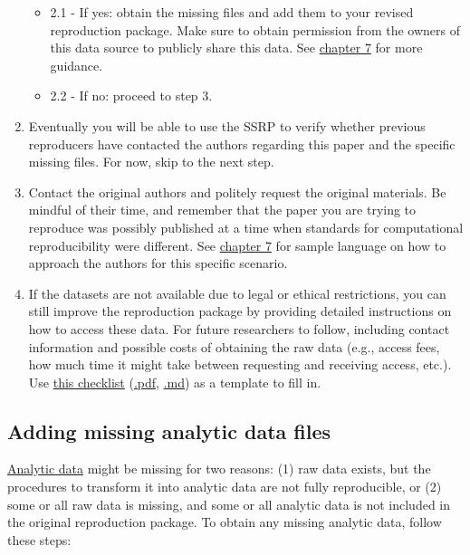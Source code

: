 \documentclass[
  openany]{book}
\providecommand{\tightlist}{%
  \setlength{\itemsep}{0pt}\setlength{\parskip}{0pt}}
\begin{document}
\begin{enumerate}
  \begin{itemize}
  \tightlist
  \item
    2.1 - If yes: obtain the missing files and add them to your revised reproduction package. Make sure to obtain permission from the owners of this data source to publicly share this data. See \href{https://bitss.github.io/ACRE/guidance-for-a-constructive-exchange-between-reproducers-and-original-authors.html}{chapter 7} for more guidance.\\
  \item
    2.2 - If no: proceed to step 3.\\
  \end{itemize}
\item
  Eventually you will be able to use the SSRP to verify whether previous reproducers have contacted the authors regarding this paper and the specific missing files. For now, skip to the next step.
\item
  Contact the original authors and politely request the original materials. Be mindful of their time, and remember that the paper you are trying to reproduce was possibly published at a time when standards for computational reproducibility were different. See \href{https://bitss.github.io/ACRE/guidance-for-a-constructive-exchange-between-reproducers-and-original-authors.html}{chapter 7} for sample language on how to approach the authors for this specific scenario.\\
\item
  If the datasets are not available due to legal or ethical restrictions, you can still improve the reproduction package by providing detailed instructions on how to access these data. For future researchers to follow, including contact information and possible costs of obtaining the raw data (e.g., access fees, how much time it might take between requesting and receiving access, etc.). Use \href{sample-DAS.html}{this checklist} (\href{sample-DAS.pdf}{.pdf}, \href{https://github.com/BITSS/ACRE/blob/master/sample-DAS.md}{.md}) as a template to fill in.
\end{enumerate}

\hypertarget{ad}{%
\subsection{Adding missing analytic data files}\label{ad}}

\protect\hyperlink{describe-inputs}{Analytic data} might be missing for two reasons: (1) raw data exists, but the procedures to transform it into analytic data are not fully reproducible, or (2) some or all raw data is missing, and some or all analytic data is not included in the original reproduction package. To obtain any missing analytic data, follow these steps:
\end{document}
